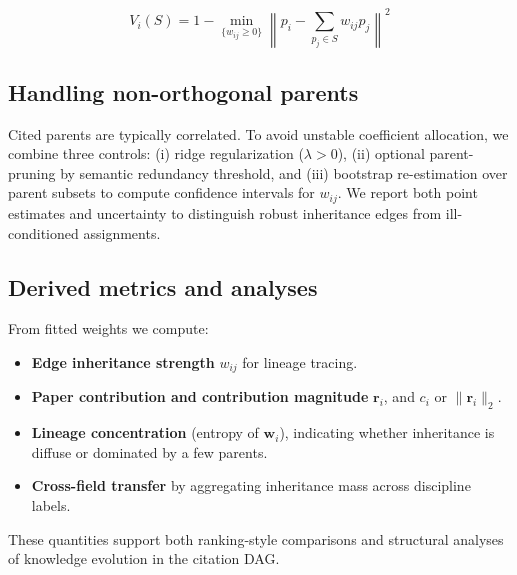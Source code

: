 \begin{equation}
V_i(S)
=
1-
\min_{\{w_{ij}\ge0\}}
\left\|
p_i-
\sum_{p_j\in S} w_{ij}p_j
\right\|^2
\end{equation}


\subsection{Handling non-orthogonal parents} %
Cited parents are typically correlated. To avoid unstable coefficient allocation, we combine three controls: (i) ridge regularization ($\lambda>0$), (ii) optional parent-pruning by semantic redundancy threshold, and (iii) bootstrap re-estimation over parent subsets to compute confidence intervals for $w_{ij}$. We report both point estimates and uncertainty to distinguish robust inheritance edges from ill-conditioned assignments.

\subsection{Derived metrics and analyses}
From fitted weights we compute:
\begin{itemize}
    \item \textbf{Edge inheritance strength} $w_{ij}$ for lineage tracing.
    \item \textbf{Paper contribution and contribution  magnitude} $\mathbf{r}_i$, and  $c_i$ or  $\|\mathbf{r}_i\|_2$. %
    \item \textbf{Lineage concentration} (entropy of $\mathbf{w}_i$), indicating whether inheritance is diffuse or dominated by a few parents.
    \item \textbf{Cross-field transfer} by aggregating inheritance mass across discipline labels.
\end{itemize}

These quantities support both ranking-style comparisons and structural analyses of knowledge evolution in the citation DAG.
